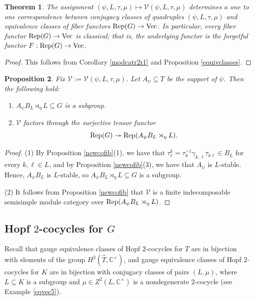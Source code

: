 \documentclass{amsart}
\newtheorem{theorem}{Theorem}[section]
\newtheorem{proposition}[theorem]{Proposition}
\theoremstyle{definition}
\newcommand{\Rep}{{\rm Rep}}
\newcommand{\Vect}{{\rm Vec}}
\newcommand{\V}{\mathscr{V}}
\numberwithin{equation}{section}
\begin{document}
\begin{theorem}\label{modcatr2}
The assignment $(\psi,L,\tau,\mu)\mapsto \V(\psi,L,\tau,\mu)$ determines a one to one correspondence between conjugacy classes of quadruples $(\psi,L,\tau,\mu)$ and equivalence classes of fiber functors $\Rep(G)\to\Vect$. In particular, 
every fiber functor $\Rep(G)\to\Vect$ is classical; that is, the underlying functor is the forgetful functor $F:\Rep(G)\to\Vect$. 
\end{theorem}

\begin{proof}
This follows from Corollary \ref{modcatr2r1} and Proposition \ref{equivclasses}.
\end{proof}

\begin{proposition}\label{finalminimal2}
Fix $\V:=\V(\psi,L,\tau,\mu)$. Let $A_{\psi}\subseteq T$ be the support of $\psi$. Then 
the following hold:
\begin{enumerate}
\item
$A_{\psi}B_L\rtimes_{\eta} L\subseteq G$ is a subgroup.
\item
$\V$ factors through the surjective tensor functor 
$$\Rep(G)\twoheadrightarrow \Rep(A_{\psi}B_L\rtimes_{\eta} L).$$
\end{enumerate} 
\end{proposition}

\begin{proof}
(1) By Proposition \ref{newcofib}(1), we have that $\tau_{\ell}^k=\tau_{k}^{-1}\gamma_{k,\ell}\tau_{k\ell}\in B_L$ for every $k,\ell\in L$, and by Proposition \ref{newcofib}(3), we have that $A_{\psi}$ is $L$-stable. Hence, $A_{\psi}B_L$ is $L$-stable, so $A_{\psi}B_L\rtimes_{\eta} L\subseteq G$ is a subgroup.

(2) It follows from Proposition \ref{newcofib} that $\V$ is a finite indecomposable semisimple module category over $\Rep(A_{\psi}B_L\rtimes_{\eta} L)$.
\end{proof}

\subsection{Hopf $2$-cocycles for $G$} 
Recall \cite{G} that 
gauge equivalence classes of Hopf $2$-cocycles for $T$ are in bijection with elements of the group $H^2(\widehat{T},\mathbb{C}^{\times})$, and gauge equivalence classes of Hopf $2$-cocycles for $K$ are in bijection with conjugacy classes of pairs $(L,\mu)$, where $L\subseteq K$ is a subgroup and $\mu\in Z^2(L,\mathbb{C}^{\times})$ is a nondegenerate $2$-cocycle (see Example \ref{eqvec5}).
\end{document}
